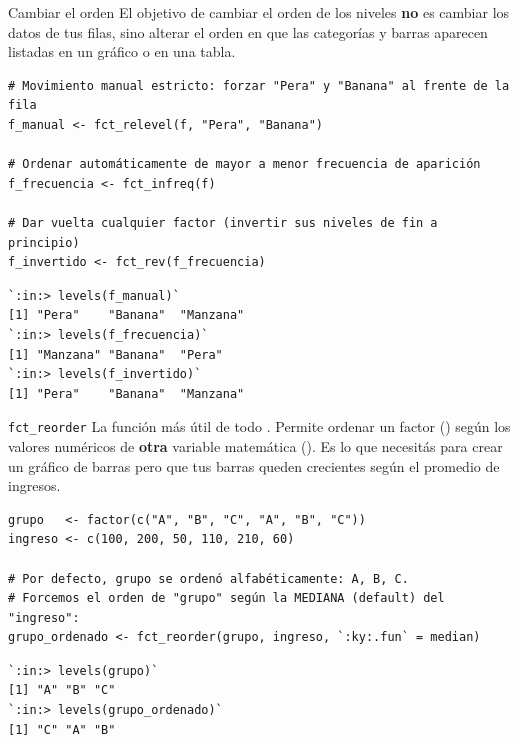 \documentclass[8pt]{beamer}
\begin{document}
	\begin{frame}[fragile]{Cambiar el orden}
		El objetivo de cambiar el orden de los niveles \textbf{no} es cambiar los datos de tus filas, sino alterar el orden en que las categorías y barras aparecen listadas en un gráfico o en una tabla.
		
\begin{lstlisting}[style=RScript]
# Movimiento manual estricto: forzar "Pera" y "Banana" al frente de la fila
f_manual <- fct_relevel(f, "Pera", "Banana")

# Ordenar automáticamente de mayor a menor frecuencia de aparición
f_frecuencia <- fct_infreq(f)

# Dar vuelta cualquier factor (invertir sus niveles de fin a principio)
f_invertido <- fct_rev(f_frecuencia)
\end{lstlisting}
\begin{lstlisting}[style=RConsole]
`:in:> levels(f_manual)`
[1] "Pera"    "Banana"  "Manzana"
`:in:> levels(f_frecuencia)`
[1] "Manzana" "Banana"  "Pera"   
`:in:> levels(f_invertido)`
[1] "Pera"    "Banana"  "Manzana"
\end{lstlisting}
	\end{frame}

	\begin{frame}[fragile]{\texttt{fct\_reorder}}
		La función más útil de todo . Permite ordenar un factor () según los valores numéricos de \textbf{otra} variable matemática (). Es lo que necesitás para crear un gráfico de barras pero que tus barras queden crecientes según el promedio de ingresos.
		
\begin{lstlisting}[style=RScript]
grupo   <- factor(c("A", "B", "C", "A", "B", "C"))
ingreso <- c(100, 200, 50, 110, 210, 60)

# Por defecto, grupo se ordenó alfabéticamente: A, B, C.
# Forcemos el orden de "grupo" según la MEDIANA (default) del "ingreso":
grupo_ordenado <- fct_reorder(grupo, ingreso, `:ky:.fun` = median)
\end{lstlisting}
\begin{lstlisting}[style=RConsole]
`:in:> levels(grupo)`
[1] "A" "B" "C"
`:in:> levels(grupo_ordenado)`
[1] "C" "A" "B"
\end{lstlisting}
	\end{frame}
\end{document}
